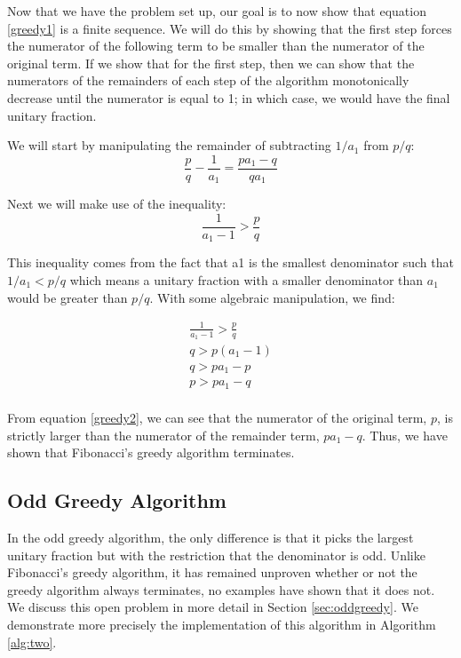 \documentclass[paper=a4, fontsize=11pt]{scrartcl}
\numberwithin{equation}{section}	 %
\numberwithin{figure}{section}	 %
\numberwithin{table}{section}	 %
\begin{document}
Now that we have the problem set up, our goal is to now show that equation \ref{greedy1} is a finite sequence. We will do this by showing that the first step forces the numerator of the following term to be smaller than the numerator of the original term. If we show that for the first step, then we can show that the numerators of the remainders of each step of the algorithm monotonically decrease until the numerator is equal to 1; in which case, we would have the final unitary fraction.

We will start by manipulating the remainder of subtracting $1/a_1$ from $p/q$:
\begin{equation}
	\frac{p}{q} - \frac{1}{a_1} = \frac{pa_1 - q}{qa_1}
\end{equation}

Next we will make use of the inequality:
\begin{equation}
	\frac{1}{a_1 - 1} > \frac{p}{q}
\end{equation}

This inequality comes from the fact that a1 is the smallest denominator such that $1/a_1 < p/q$ which means a unitary fraction with a smaller denominator than $a_1$ would be greater than $p/q$. With some algebraic manipulation, we find:

\begin{equation}\label{greedy2}
\begin{split}
	\frac{1}{a_1 - 1} > \frac{p}{q} \\
	q > p(a_1 - 1) \\
	q > pa_1 - p \\
	p > pa_1 - q \\
\end{split}
\end{equation}

From equation \ref{greedy2}, we can see that the numerator of the original term, $p$, is strictly larger than the numerator of the remainder term, $pa_1 - q$. Thus, we have shown that Fibonacci’s greedy algorithm terminates.

\subsection{Odd Greedy Algorithm}
In the odd greedy algorithm, the only difference is that it picks the largest unitary fraction but with the restriction that the denominator is odd. Unlike Fibonacci's greedy algorithm, it has remained unproven whether or not the greedy algorithm always terminates, no examples have shown that it does not. We discuss this open problem in more detail in Section \ref{sec:oddgreedy}. We demonstrate more precisely the implementation of this algorithm in Algorithm \ref{alg:two}.
\end{document}
